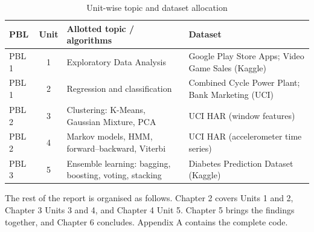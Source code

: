 \begin{table}[H]
\centering
\caption{Unit-wise topic and dataset allocation}
\label{tab:allocation}
\renewcommand{\arraystretch}{1.3}
\begin{tabularx}{\linewidth}{@{}l c >{\raggedright\arraybackslash}X >{\raggedright\arraybackslash}X@{}}
\toprule
\textbf{PBL} & \textbf{Unit} & \textbf{Allotted topic / algorithms} & \textbf{Dataset} \\
\midrule
PBL 1 & 1 & Exploratory Data Analysis & Google Play Store Apps; Video Game Sales (Kaggle) \\
PBL 1 & 2 & Regression and classification & Combined Cycle Power Plant; Bank Marketing (UCI) \\
PBL 2 & 3 & Clustering: K-Means, Gaussian Mixture, PCA & UCI HAR (window features) \\
PBL 2 & 4 & Markov models, HMM, forward–backward, Viterbi & UCI HAR (accelerometer time series) \\
PBL 3 & 5 & Ensemble learning: bagging, boosting, voting, stacking & Diabetes Prediction Dataset (Kaggle) \\
\bottomrule
\end{tabularx}
\end{table}

The rest of the report is organised as follows. Chapter 2 covers Units 1 and 2, Chapter 3 Units 3 and 4, and Chapter 4
Unit 5. Chapter 5 brings the findings together, and Chapter 6 concludes. Appendix A contains the complete code.
